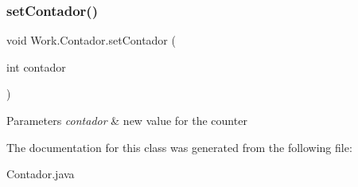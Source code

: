 \subsubsection{\texorpdfstring{set\+Contador()}{setContador()}}
{\footnotesize\ttfamily void Work.\+Contador.\+set\+Contador (\begin{DoxyParamCaption}\item[{int}]{contador }\end{DoxyParamCaption})\hspace{0.3cm}{\ttfamily [inline]}}


\begin{DoxyParams}{Parameters}
{\em contador} & new value for the counter \\
\hline
\end{DoxyParams}


The documentation for this class was generated from the following file\+:\begin{DoxyCompactItemize}
\item 
Contador.\+java\end{DoxyCompactItemize}

